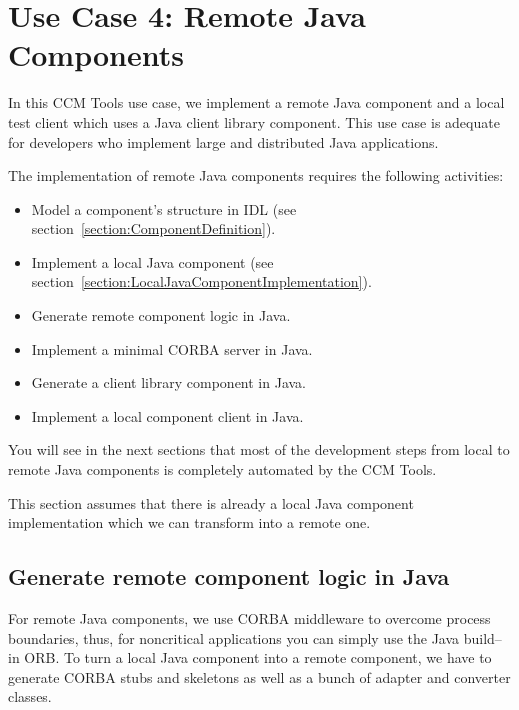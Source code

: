 \section{Use Case 4: Remote Java Components}
\label{section:RemoteJavaComponentImplementation}

In this CCM Tools use case, we implement a remote Java component and a local
test client which uses a Java client library component.
This use case is adequate for developers who implement large and distributed
Java applications.
 
\vspace{3mm}
The implementation of remote Java components requires the following activities:
\begin{itemize}
	\item Model a component's structure in IDL 
			(see section~\ref{section:ComponentDefinition}). 
	\item Implement a local Java component (see section~\ref{section:LocalJavaComponentImplementation}).
	\item Generate remote component logic in Java.
	\item Implement a minimal CORBA server in Java.
	\item Generate a client library component in Java.
	\item Implement a local component client in Java.
\end{itemize}

You will see in the next sections that most of the development steps from local
to remote Java components is completely automated by the CCM Tools.

\vspace{3mm}
This section assumes that there is already a local Java component implementation
which we can transform into a remote one.


\subsection{Generate remote component logic in Java}
\label{subsection:GenerateRemoteComponentLogicJava}
For remote Java components, we use CORBA middleware to overcome process
boundaries, thus, for noncritical applications you can simply use the Java
build--in ORB.
To turn a local Java component into a remote component, we have to generate CORBA
stubs and skeletons as well as a bunch of adapter and converter classes.


